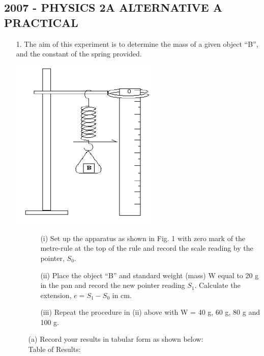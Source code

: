 \subsection{2007 - PHYSICS 2A ALTERNATIVE A PRACTICAL}

\begin{enumerate}
\item[1.] The aim of this experiment is to determine the mass of a given object ``B'', and the constant of the spring provided.

\begin{center}
\includegraphics[width=7cm]{./img/2007-1-alt.png}
\end{center}

\begin{itemize}
\item[]
\begin{itemize}
\item[(i)] Set up the apparatus as shown in Fig. 1 with zero mark of the metre-rule at the top of the rule and record the scale reading by the pointer, $S_0$.
\item[(ii)] Place the object ``B'' and standard weight (mass) W equal to 20 g in the pan and record the new pointer reading $S_1$. Calculate the extension, $e = S_1 - S_0$ in cm.
\item[(iii)] Repeat the procedure in (ii) above with W = 40 g, 60 g, 80 g and 100 g.
\end{itemize}
\item[(a)] Record your results in tabular form as shown below:\\
Table of Results:


\end{itemize}
\end{enumerate}
